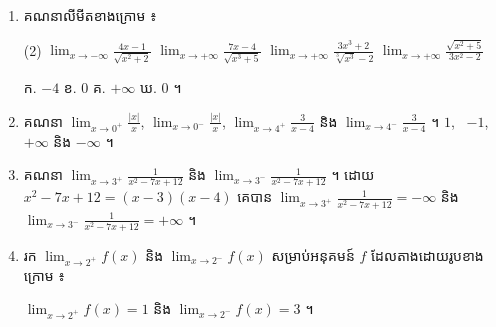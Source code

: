 \begin{enumerate}[1]
  ខ. $g'(x) = 4x(3x^2 - 1)$ ៖ $g'(x) < 0$ ពេល $x < -\dfrac{1}{\sqrt{3}}$ ឬ $0 < x < \dfrac{1}{\sqrt{3}}$ ហើយ $g'(x) > 0$ ពេល $-\dfrac{1}{\sqrt{3}} < x < 0$ ឬ $x > \dfrac{1}{\sqrt{3}}$ ។ \ $g''(x) = 4(3x - 1)(3x + 1)$ ៖ $g''(x) < 0$ ពេល $-\dfrac{1}{3} < x < \dfrac{1}{3}$ ហើយ $g''(x) > 0$ ពេល $x < -\dfrac{1}{3}$ ឬ $x > \dfrac{1}{3}$ ។
  \item គណនាលីមីតខាងក្រោម ៖
  \begin{tasks}(2)
    \task $\displaystyle\lim_{x \to -\infty}\frac{4x - 1}{\sqrt{x^2 + 2}}$
    \task $\displaystyle\lim_{x \to +\infty}\frac{7x - 4}{\sqrt{x^3 + 5}}$
    \task $\displaystyle\lim_{x \to +\infty}\frac{3x^3 + 2}{\sqrt[3]{x^3} - 2}$
    \task $\displaystyle\lim_{x \to +\infty}\frac{\sqrt{x^2 + 5}}{3x^2 - 2}$
  \end{tasks}
  \ans
  ក. $-4$ \quad ខ. $0$ \quad គ. $+\infty$ \quad ឃ. $0$ ។
  \item គណនា $\displaystyle\lim_{x \to 0^+}\frac{|x|}{x}$, $\displaystyle\lim_{x \to 0^-}\frac{|x|}{x}$, $\displaystyle\lim_{x \to 4^+}\frac{3}{x - 4}$ និង $\displaystyle\lim_{x \to 4^-}\frac{3}{x - 4}$ ។
  \ans
  $1$, \ $-1$, \ $+\infty$ និង $-\infty$ ។
  \item គណនា $\displaystyle\lim_{x \to 3^+}\frac{1}{x^2 - 7x + 12}$ និង $\displaystyle\lim_{x \to 3^-}\frac{1}{x^2 - 7x + 12}$ ។
  \ans
  ដោយ $x^2 - 7x + 12 = (x - 3)(x - 4)$ គេបាន $\displaystyle\lim_{x \to 3^+}\frac{1}{x^2 - 7x + 12} = -\infty$ និង $\displaystyle\lim_{x \to 3^-}\frac{1}{x^2 - 7x + 12} = +\infty$ ។
  \item រក $\displaystyle\lim_{x \to 2^+} f(x)$ និង $\displaystyle\lim_{x \to 2^-} f(x)$ សម្រាប់អនុគមន៍ $f$ ដែលតាងដោយរូបខាងក្រោម ៖

  \begin{center}
  \end{center}
  \ans
  $\displaystyle\lim_{x \to 2^+} f(x) = 1$ និង $\displaystyle\lim_{x \to 2^-} f(x) = 3$ ។
\end{enumerate}

